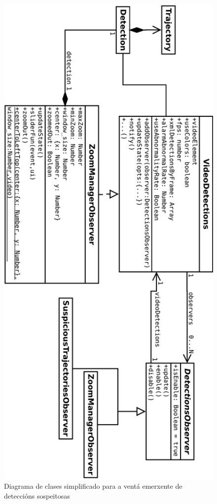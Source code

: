         \begin{figure}[htp]
        \begin{center}
            \includegraphics[scale=0.45]{figures/SuspiciousPopupJS.pdf}
            \caption{Diagrama de clases simplificado para a ventá emerxente de deteccións sospeitosas}
        \label{fig:SuspiciousPopupJS}
        \end{center}
        \end{figure} 
        
